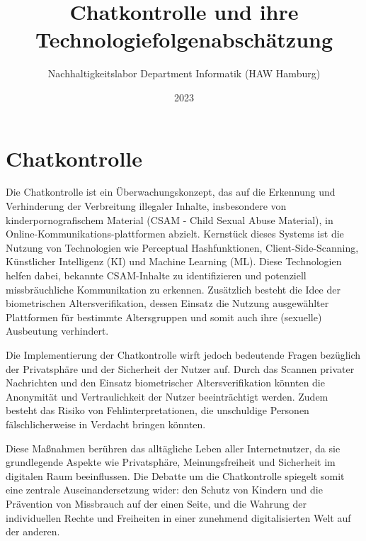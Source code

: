 \documentclass[a4paper]{article}
\title{Chatkontrolle und ihre Technologiefolgenabschätzung}
\author{Nachhaltigkeitslabor Department Informatik (HAW Hamburg)}
\date{2023}
\begin{document}
\maketitle

\section {Chatkontrolle}
Die Chatkontrolle ist ein Überwachungskonzept, das auf die Erkennung und Verhinderung der Verbreitung illegaler Inhalte, insbesondere von kinderpornografischem Material (CSAM - Child Sexual Abuse Material), in Online-Kommunikations-plattformen abzielt. Kernstück dieses Systems ist die Nutzung von Technologien wie Perceptual Hashfunktionen, Client-Side-Scanning, Künstlicher Intelligenz (KI) und Machine Learning (ML). Diese Technologien helfen dabei, bekannte CSAM-Inhalte zu identifizieren und potenziell missbräuchliche Kommunikation zu erkennen. Zusätzlich besteht die Idee der biometrischen Altersverifikation, dessen Einsatz die Nutzung ausgewählter Plattformen für bestimmte Altersgruppen und somit auch ihre (sexuelle) Ausbeutung verhindert.



Die Implementierung der Chatkontrolle wirft jedoch bedeutende Fragen bezüglich der Privatsphäre und der Sicherheit der Nutzer auf. Durch das Scannen privater Nachrichten und den Einsatz biometrischer Altersverifikation könnten die Anonymität und Vertraulichkeit der Nutzer beeinträchtigt werden. Zudem besteht das Risiko von Fehlinterpretationen, die unschuldige Personen fälschlicherweise in Verdacht bringen könnten.

Diese Maßnahmen berühren das alltägliche Leben aller Internetnutzer, da sie grundlegende Aspekte wie Privatsphäre, Meinungsfreiheit und Sicherheit im digitalen Raum beeinflussen. Die Debatte um die Chatkontrolle spiegelt somit eine zentrale Auseinandersetzung wider: den Schutz von Kindern und die Prävention von Missbrauch auf der einen Seite, und die Wahrung der individuellen Rechte und Freiheiten in einer zunehmend digitalisierten Welt auf der anderen.
\end{document}
